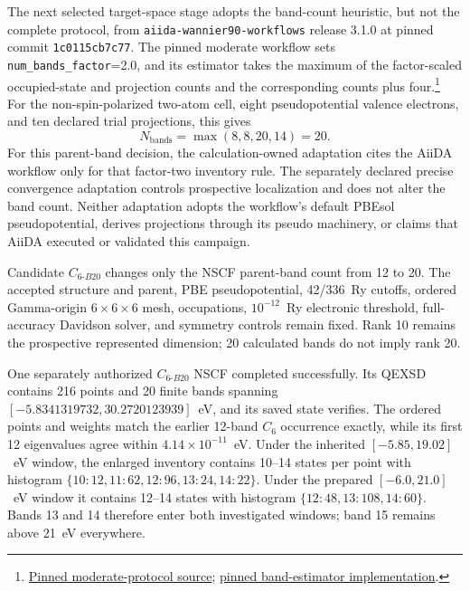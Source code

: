 \documentclass[11pt]{report}
\begin{document}
The next selected target-space stage adopts the band-count heuristic, but not the
complete protocol, from \texttt{aiida-wannier90-workflows} release 3.1.0 at pinned
commit \texttt{1c0115cb7c77}.  The pinned moderate
workflow sets \texttt{num\_bands\_factor}=2.0, and its estimator takes the maximum of
the factor-scaled occupied-state and projection counts and the corresponding counts
plus four.\footnote{\href{https://github.com/aiidateam/aiida-wannier90-workflows/blob/1c0115cb7c77541a0bd549bc05005df435d651b6/src/aiida_wannier90_workflows/workflows/protocols/base/wannier90.yaml\#L6-L25}{Pinned moderate-protocol source};
\href{https://github.com/aiidateam/aiida-wannier90-workflows/blob/1c0115cb7c77541a0bd549bc05005df435d651b6/src/aiida_wannier90_workflows/utils/pseudo/__init__.py\#L292-L342}{pinned band-estimator implementation}.}
For the non-spin-polarized two-atom cell, eight pseudopotential valence electrons, and
ten declared trial projections, this gives
\begin{equation}
  N_{\mathrm{bands}}=\max(8,8,20,14)=20.
\end{equation}
For this parent-band decision, the calculation-owned adaptation cites the AiiDA
workflow only for that factor-two inventory rule.  The separately declared precise
convergence adaptation controls prospective localization and does not alter the band
count.  Neither adaptation adopts the workflow's default PBEsol pseudopotential,
derives projections through its pseudo machinery, or claims that AiiDA executed or
validated this campaign.

Candidate $C_{6\text{-}B20}$ changes only the NSCF parent-band count from 12 to 20.
The accepted structure and parent, PBE pseudopotential, 42/336~Ry cutoffs, ordered
Gamma-origin $6\times6\times6$ mesh, occupations, $10^{-12}$~Ry electronic threshold,
full-accuracy Davidson solver, and symmetry controls remain fixed.  Rank 10 remains the
prospective represented dimension; 20 calculated bands do not imply rank 20.

One separately authorized $C_{6\text{-}B20}$ NSCF completed successfully.  Its QEXSD
contains 216 points and 20 finite bands spanning $[-5.8341319732,30.2720123939]$~eV,
and its saved state verifies.  The ordered points and weights match the earlier
12-band $C_6$ occurrence exactly, while its first 12 eigenvalues agree within
$4.14\times10^{-11}$~eV.  Under the inherited $[-5.85,19.02]$~eV window, the enlarged
inventory contains 10--14 states per point with histogram
$\{10\!:\!12,11\!:\!62,12\!:\!96,13\!:\!24,14\!:\!22\}$.  Under the prepared
$[-6.0,21.0]$~eV window it contains 12--14 states with histogram
$\{12\!:\!48,13\!:\!108,14\!:\!60\}$.  Bands 13 and 14 therefore enter both
investigated windows; band 15 remains above 21~eV everywhere.
\end{document}
